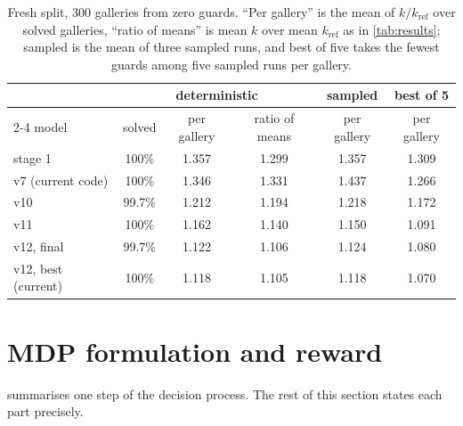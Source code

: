 \documentclass[11pt,a4paper]{article}
\begin{document}
\begin{table}[!htbp]
\centering\small
\caption{Fresh split, $300$ galleries from zero guards. ``Per gallery'' is the mean of
$k/k_{\mathrm{ref}}$ over solved galleries, ``ratio of means'' is mean $k$ over mean
$k_{\mathrm{ref}}$ as in \cref{tab:results}; sampled is the mean of three sampled runs, and best
of five takes the fewest guards among five sampled runs per gallery.}
\label{tab:fresh}
\begin{tabular}{lccccc}
\toprule
 & \multicolumn{3}{c}{deterministic} & sampled & best of 5 \\
\cmidrule(lr){2-4}
model & solved & per gallery & ratio of means & per gallery & per gallery \\
\midrule
stage 1                & 100\%  & 1.357 & 1.299 & 1.357 & 1.309 \\
v7 (current code)      & 100\%  & 1.346 & 1.331 & 1.437 & 1.266 \\
v10                    & 99.7\% & 1.212 & 1.194 & 1.218 & 1.172 \\
v11                    & 100\%  & 1.162 & 1.140 & 1.150 & 1.091 \\
v12, final             & 99.7\% & 1.122 & 1.106 & 1.124 & 1.080 \\
v12, best (current)    & 100\%  & 1.118 & 1.105 & 1.118 & 1.070 \\
\bottomrule
\end{tabular}
\end{table}

\section{MDP formulation and reward}\label{sec:mdp}

 summarises one step of the decision process. The rest of this section states
each part precisely.
\end{document}
